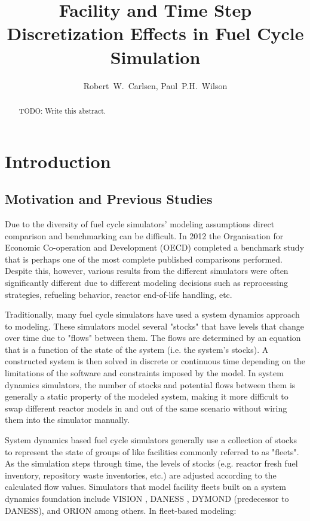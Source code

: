 \documentclass{style}
\title{Facility and Time Step Discretization Effects in Fuel Cycle Simulation}
\author{Robert~W.~Carlsen, Paul~P.H.~Wilson}
\institute{University of Wisconsin - Madison, Department of Nuclear Engineering and Engineering Physics, Madison, WI 53706}
\date{}
\begin{document}
\newpage
\begin{abstract}
TODO: Write this abstract.
\end{abstract}

\section{Introduction}

\subsection{Motivation and Previous Studies}

Due to the diversity of fuel cycle simulators' modeling assumptions direct
comparison and benchmarking can be difficult.  In 2012 the Organisation for
Economic Co-operation and Development (OECD) completed a benchmark study
\cite{oecd2012benchmark} that is perhaps one of the most complete published
comparisons performed.  Despite this, however, various results from the
different simulators were often significantly different due to different
modeling decisions such as reprocessing strategies, refueling behavior,
reactor end-of-life handling, etc.

Traditionally, many fuel cycle simulators have used a system dynamics approach
\cite{forrester_industrial_1961} to modeling. These simulators model several
"stocks" that have levels that change over time due to "flows" between them.
The flows are determined by an equation that is a function of the state of the
system (i.e. the system's stocks).  A constructed system is then solved
in discrete or continuous time depending on the limitations of the software
and constraints imposed by the model.  In system dynamics simulators, the
number of stocks and potential flows between them is generally a static
property of the modeled system, making it more difficult to swap different
reactor models in and out of the same scenario without wiring them into the
simulator manually.

System dynamics based fuel cycle simulators generally use a collection of
stocks to represent the state of groups of like facilities commonly referred
to as "fleets".  As the simulation steps through time, the levels of stocks
(e.g. reactor fresh fuel inventory, repository waste inventories, etc.) are
adjusted according to the calculated flow values.  Simulators that model
facility fleets built on a system dynamics foundation include VISION
\cite{jacobson_verifiable_2010}, DANESS \cite{van_den_durpel_daness_2009},
DYMOND (predecessor to DANESS), and ORION among others.  In fleet-based
modeling:
\end{document}
